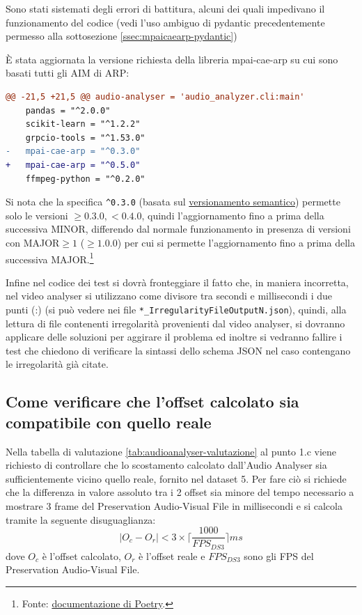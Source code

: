 Sono stati sistemati degli errori di battitura, alcuni dei quali impedivano il funzionamento del codice (vedi l'uso ambiguo di pydantic precedentemente permesso alla sottosezione \ref{ssec:mpaicaearp-pydantic})

È stata aggiornata la versione richiesta della libreria mpai-cae-arp su cui sono basati tutti gli \ac{AIM} di \ac{ARP}:
\begin{lstlisting}[language=diff]
@@ -21,5 +21,5 @@ audio-analyser = 'audio_analyzer.cli:main'
    pandas = "^2.0.0"
    scikit-learn = "^1.2.2"
    grpcio-tools = "^1.53.0"
-   mpai-cae-arp = "^0.3.0"
+   mpai-cae-arp = "^0.5.0"
    ffmpeg-python = "^0.2.0"
\end{lstlisting}
Si nota che la specifica \verb|^0.3.0| (basata sul \href{https://semver.org/lang/it/}{versionamento semantico}) permette solo le versioni $\ge0.3.0, <0.4.0$, quindi l'aggiornamento fino a prima della successiva MINOR, differendo dal normale funzionamento in presenza di versioni con MAJOR$\ge1$ ($\ge1.0.0$) per cui si permette l'aggiornamento fino a prima della successiva MAJOR.\footnote{Fonte: \href{https://python-poetry.org/docs/dependency-specification/\#caret-requirements}{documentazione di Poetry}.}

Infine nel codice dei test si dovrà fronteggiare il fatto che, in maniera incorretta, nel video analyser si utilizzano come divisore tra secondi e millisecondi i due punti (:) (si può vedere nei file \verb|*_IrregularityFileOutputN.json|), quindi, alla lettura di file contenenti irregolarità provenienti dal video analyser, si dovranno applicare delle soluzioni per aggirare il problema ed inoltre si vedranno fallire i test che chiedono di verificare la sintassi dello schema JSON nel caso contengano le irregolarità già citate.


\subsection{Come verificare che l'offset calcolato sia compatibile con quello reale} \label{ssec:audioanalyser-offset}   %
Nella tabella di valutazione \ref{tab:audioanalyser-valutazione} al punto 1.c viene richiesto di controllare che lo scostamento calcolato dall'Audio Analyser sia sufficientemente vicino quello reale, fornito nel dataset 5.
Per fare ciò si richiede che la differenza in valore assoluto tra i 2 offset sia minore del tempo necessario a mostrare 3 frame del Preservation Audio-Visual File in millisecondi e si calcola tramite la seguente disuguaglianza:
\begin{equation}
    |O_c - O_r| < 3 \times \big\lceil\frac{1000}{FPS_{DS3}}\big\rceil ms
\end{equation}
dove $O_c$ è l'offset calcolato, $O_r$ è l'offset reale e $FPS_{DS3}$ sono gli FPS del Preservation Audio-Visual File.

